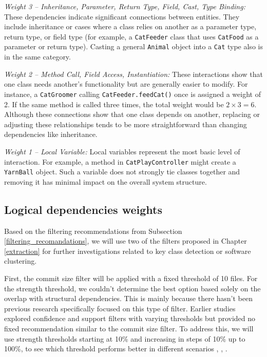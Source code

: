 \textit{Weight 3 – Inheritance, Parameter, Return Type, Field, Cast, Type Binding:}  
These dependencies indicate significant connections between entities. They include inheritance or cases where a class relies on another as a parameter type, return type, or field type (for example, a \texttt{CatFeeder} class that uses \texttt{CatFood} as a parameter or return type). Casting a general \texttt{Animal} object into a \texttt{Cat} type also is in the same category. 

\textit{Weight 2 – Method Call, Field Access, Instantiation:}  
These interactions show that one class needs another’s functionality but are generally easier to modify. For instance, a \texttt{CatGroomer} calling \texttt{CatFeeder.feedCat()} once is assigned a weight of 2. If the same method is called three times, the total weight would be \(2 \times 3 = 6\). Although these connections show that one class depends on another, replacing or adjusting these relationships tends to be more straightforward than changing dependencies like inheritance.

\textit{Weight 1 – Local Variable:}  
Local variables represent the most basic level of interaction. For example, a method in \texttt{CatPlayController} might create a \texttt{YarnBall} object. Such a variable does not strongly tie classes together and removing it has minimal impact on the overall system structure.




\subsection{Logical dependencies weights}
\label{subsec:logical_weights}
\hspace{4em}Based on the filtering recommendations from Subsection \ref{filtering_recomandations}, we will use two of the filters proposed in Chapter \ref{extraction} for further investigations related to key class detection or software clustering.

First, the commit size filter will be applied with a fixed threshold of 10 files. For the strength threshold, we couldn't determine the best option based solely on the overlap with structural dependencies. This is mainly because there hasn’t been previous research specifically focused on this type of filter. Earlier studies explored confidence and support filters with varying thresholds but provided no fixed recommendation similar to the commit size filter. To address this, we will use strength thresholds starting at 10\% and increasing in steps of 10\% up to 100\%, to see which threshold performs better in different scenarios \cite{b4}, \cite{DepSACI}, \cite{enase19}.

